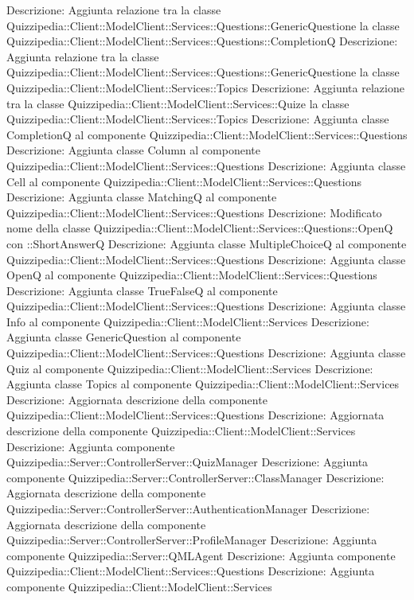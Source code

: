 Descrizione: Aggiunta relazione tra la classe Quizzipedia::Client::ModelClient::Services::Questions::GenericQuestione la classe Quizzipedia::Client::ModelClient::Services::Questions::CompletionQ 
Descrizione: Aggiunta relazione tra la classe Quizzipedia::Client::ModelClient::Services::Questions::GenericQuestione la classe Quizzipedia::Client::ModelClient::Services::Topics 
Descrizione: Aggiunta relazione tra la classe Quizzipedia::Client::ModelClient::Services::Quize la classe Quizzipedia::Client::ModelClient::Services::Topics 
Descrizione: Aggiunta classe CompletionQ al componente Quizzipedia::Client::ModelClient::Services::Questions 
Descrizione: Aggiunta classe Column al componente Quizzipedia::Client::ModelClient::Services::Questions 
Descrizione: Aggiunta classe Cell al componente Quizzipedia::Client::ModelClient::Services::Questions 
Descrizione: Aggiunta classe MatchingQ al componente Quizzipedia::Client::ModelClient::Services::Questions 
Descrizione: Modificato nome della classe Quizzipedia::Client::ModelClient::Services::Questions::OpenQ con ::ShortAnswerQ 
Descrizione: Aggiunta classe MultipleChoiceQ al componente Quizzipedia::Client::ModelClient::Services::Questions 
Descrizione: Aggiunta classe OpenQ al componente Quizzipedia::Client::ModelClient::Services::Questions 
Descrizione: Aggiunta classe TrueFalseQ al componente Quizzipedia::Client::ModelClient::Services::Questions 
Descrizione: Aggiunta classe Info al componente Quizzipedia::Client::ModelClient::Services 
Descrizione: Aggiunta classe GenericQuestion al componente Quizzipedia::Client::ModelClient::Services::Questions 
Descrizione: Aggiunta classe Quiz al componente Quizzipedia::Client::ModelClient::Services 
Descrizione: Aggiunta classe Topics al componente Quizzipedia::Client::ModelClient::Services 
Descrizione: Aggiornata descrizione della componente Quizzipedia::Client::ModelClient::Services::Questions 
Descrizione: Aggiornata descrizione della componente Quizzipedia::Client::ModelClient::Services 
Descrizione: Aggiunta componente Quizzipedia::Server::ControllerServer::QuizManager 
Descrizione: Aggiunta componente Quizzipedia::Server::ControllerServer::ClassManager 
Descrizione: Aggiornata descrizione della componente Quizzipedia::Server::ControllerServer::AuthenticationManager 
Descrizione: Aggiornata descrizione della componente Quizzipedia::Server::ControllerServer::ProfileManager 
Descrizione: Aggiunta componente Quizzipedia::Server::QMLAgent 
Descrizione: Aggiunta componente Quizzipedia::Client::ModelClient::Services::Questions 
Descrizione: Aggiunta componente Quizzipedia::Client::ModelClient::Services 
